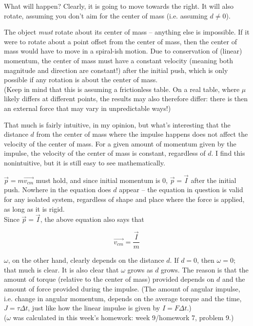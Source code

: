 \documentclass[8.01x]{subfiles}
\begin{document}
What will happen? Clearly, it is going to move towards the right. It will also rotate, assuming you don't aim for the center of mass (i.e. assuming $d \neq 0$).

The object \emph{must} rotate about its center of mass -- anything else is impossible. If it were to rotate about a point offset from the center of mass, then the center of mass would have to move in a spiral-ish motion. Due to conservation of (linear) momentum, the center of mass must have a constant velocity (meaning both magnitude and direction are constant!) after the initial push, which is only possible if any rotation is about the center of mass.\\
(Keep in mind that this is assuming a frictionless table. On a real table, where $\mu$ likely differs at different points, the results may also therefore differ: there is then an external force that may vary in unpredictable ways!)

That much is fairly intuitive, in my opinion, but what's interesting that the distance $d$ from the center of mass where the impulse happens does not affect the velocity of the center of mass. For a given amount of momentum given by the impulse, the velocity of the center of mass is constant, regardless of $d$. I find this nonintuitive, but it is still easy to see mathematically.

$\vec{p} = m \vec{v_{cm}}$ must hold, and since initial momentum is 0, $\vec{p} = \vec{I}$ after the initial push. Nowhere in the equation does $d$ appear -- the equation in question is valid for any isolated system, regardless of shape and place where the force is applied, as long as it is rigid.\\
Since $\vec{p} = \vec{I}$, the above equation also says that

\begin{equation}
\vec{v_{cm}} = \frac{\vec{I}}{m}
\end{equation}

$\omega$, on the other hand, clearly depends on the distance $d$. If $d = 0$, then $\omega = 0$; that much is clear. It is also clear that $\omega$ grows as $d$ grows. The reason is that the amount of torque (relative to the center of mass) provided depends on $d$ and the amount of force provided during the impulse. (The amount of angular impulse, i.e. change in angular momentum, depends on the average torque and the time, $J = \tau \Delta t$, just like how the linear impulse is given by $I = F \Delta t$.)\\
($\omega$ was calculated in this week's homework: week 9/homework 7, problem 9.)
\end{document}
